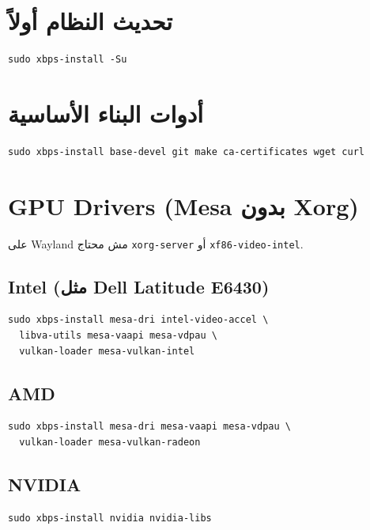 \documentclass[12pt, a4paper]{report}
\begin{document}
\section{تحديث النظام أولاً}

\begin{lstlisting}
sudo xbps-install -Su
\end{lstlisting}

\section{أدوات البناء الأساسية}

\begin{lstlisting}
sudo xbps-install base-devel git make ca-certificates wget curl
\end{lstlisting}

\section{GPU Drivers (Mesa بدون Xorg)}

\begin{tcolorbox}[notebox]
على Wayland مش محتاج \texttt{xorg-server} أو \texttt{xf86-video-intel}.
\end{tcolorbox}

\subsection{Intel (مثل Dell Latitude E6430)}
\begin{lstlisting}
sudo xbps-install mesa-dri intel-video-accel \
  libva-utils mesa-vaapi mesa-vdpau \
  vulkan-loader mesa-vulkan-intel
\end{lstlisting}

\subsection{AMD}
\begin{lstlisting}
sudo xbps-install mesa-dri mesa-vaapi mesa-vdpau \
  vulkan-loader mesa-vulkan-radeon
\end{lstlisting}

\subsection{NVIDIA}
\begin{lstlisting}
sudo xbps-install nvidia nvidia-libs
\end{lstlisting}
\end{document}
